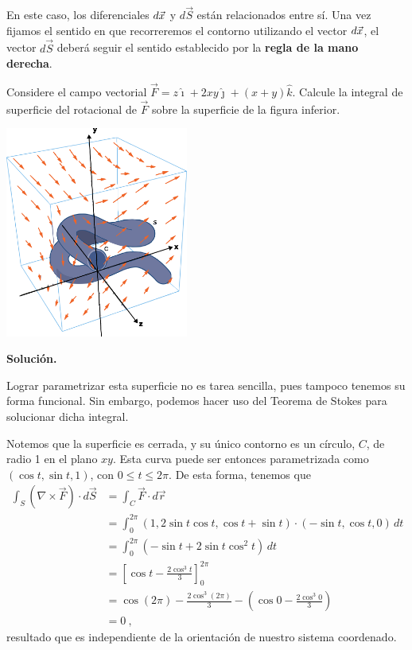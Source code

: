 En este caso, los diferenciales $d\vec{x}$ y $d\vec{S}$ están relacionados entre sí. Una vez fijamos el sentido en que recorreremos el contorno utilizando el vector $d\vec{x}$, el vector $d\vec{S}$ deberá seguir el sentido establecido por la \textbf{regla de la mano derecha}.

\begin{ejemplo}
    Considere el campo vectorial $\vec{F} = z\hat{\imath} + 2xy \hat{\jmath} + (x+y)\hat{k}$. Calcule la integral de superficie del rotacional de $\vec{F}$ sobre la superficie de la figura inferior.
    \begin{center}
        \includegraphics[width=6cm]{Figuras/superficie-complicada-2.png}
    \end{center}

    \textbf{Solución.}

    Lograr parametrizar esta superficie no es tarea sencilla, pues tampoco tenemos su forma funcional. Sin embargo, podemos hacer uso del Teorema de Stokes para solucionar dicha integral.

    Notemos que la superficie es cerrada, y su único contorno es un círculo, $C$, de radio 1 en el plano $xy$. Esta curva puede ser entonces parametrizada como $(\cos t, \sin t, 1)$, con $0 \leq t \leq 2\pi$. De esta forma, tenemos que 
    \begin{align*}
        \int_S (\nabla \times \vec{F}) \cdot d\vec{S} & = \int_C \vec{F} \cdot d\vec{r} \\
        & = \int_0^{2\pi} (1, 2 \sin t \cos t, \cos t + \sin t) \cdot (-\sin t, \cos t, 0) \, dt \\
        & = \int_0^{2\pi} (-\sin t + 2 \sin t \cos^2 t) \, dt \\
        & = \left[ \cos t - \frac{2\cos^3 t}{3} \right]_0^{2\pi} \\
        & = \cos(2\pi) - \frac{2 \cos^3 (2\pi)}{3} - \left( \cos 0 - \frac{2 \cos^3 0}{3} \right) \\
        & = 0 \ ,
    \end{align*}
    resultado que es independiente de la orientación de nuestro sistema coordenado.
\end{ejemplo}

